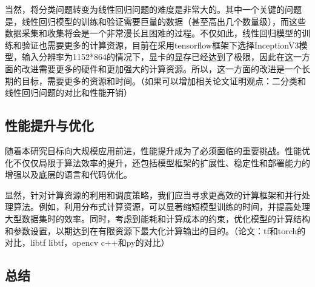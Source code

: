 当然，将分类问题转变为线性回归问题的难度是非常大的。其中一个关键的问题是，线性回归模型的训练和验证需要巨量的数据（甚至高出几个数量级），而这些数据采集和收集将会是一个非常漫长且困难的过程。不仅如此，线性回归模型的训练和验证也需要更多的计算资源，目前在采用tensorflow框架下选择InceptionV3模型，输入分辨率为1152*864的情况下，显卡的显存已经达到了极限，因此在这一方面的改进需要更多的硬件和更加强大的计算资源。所以，这一方面的改进是一个长期的目标，需要更多的资源和时间。（如果可以增加相关论文证明观点：二分类和线性回归问题的对比和性能开销）


\subsection{性能提升与优化}

随着本研究目标向大规模应用前进，性能提升成为了必须面临的重要挑战。性能优化不仅仅局限于算法效率的提升，还包括模型框架的扩展性、稳定性和部署能力的增强以及底层的语言和代码优化。

显然，针对计算资源的利用和调度策略，我们应当寻求更高效的计算框架和并行处理算法。例如，利用分布式计算资源，可以显著缩短模型训练的时间，并提高处理大型数据集时的效率。同时，考虑到能耗和计算成本的约束，优化模型的计算结构和参数设置，以期达到在有限资源下最大化计算输出的目的。（论文：tf和torch的对比，libtf libtf，opencv c++和py的对比）



\subsection{总结}











\FloatBarrier %